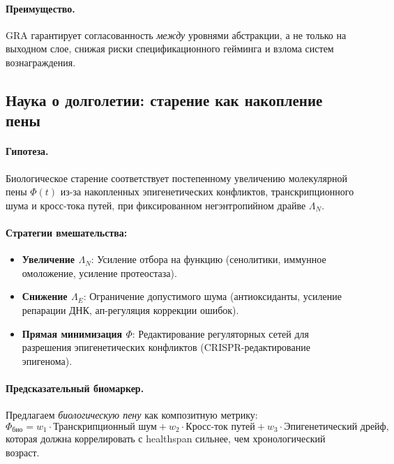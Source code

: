 \documentclass[11pt,a4paper]{article}
\theoremstyle{plain}
\theoremstyle{definition}
\theoremstyle{remark}
\newcommand{\Foam}{\Phi}
\begin{document}
\paragraph{Преимущество.} GRA гарантирует согласованность \textit{между} уровнями абстракции, а не только на выходном слое, снижая риски спецификационного гейминга и взлома систем вознаграждения.

\subsection{Наука о долголетии: старение как накопление пены}

\paragraph{Гипотеза.} Биологическое старение соответствует постепенному увеличению молекулярной пены $\Foam(t)$ из-за накопленных эпигенетических конфликтов, транскрипционного шума и кросс-тока путей, при фиксированном негэнтропийном драйве $\Lambda_N$.

\paragraph{Стратегии вмешательства:}
\begin{itemize}
    \item \textbf{Увеличение $\Lambda_N$}: Усиление отбора на функцию (сенолитики, иммунное омоложение, усиление протеостаза).
    \item \textbf{Снижение $\Lambda_E$}: Ограничение допустимого шума (антиоксиданты, усиление репарации ДНК, ап-регуляция коррекции ошибок).
    \item \textbf{Прямая минимизация $\Foam$}: Редактирование регуляторных сетей для разрешения эпигенетических конфликтов (CRISPR-редактирование эпигенома).
\end{itemize}

\paragraph{Предсказательный биомаркер.} Предлагаем \textit{биологическую пену} как композитную метрику:
\begin{equation}
\Foam_{\text{био}} = w_1 \cdot \text{Транскрипционный шум} + w_2 \cdot \text{Кросс-ток путей} + w_3 \cdot \text{Эпигенетический дрейф},
\label{eq:bio_foam}
\end{equation}
которая должна коррелировать с healthspan сильнее, чем хронологический возраст.
\end{document}
